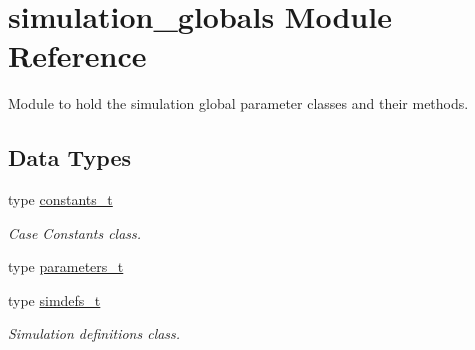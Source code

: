 \hypertarget{namespacesimulation__globals}{}\section{simulation\+\_\+globals Module Reference}
\label{namespacesimulation__globals}


Module to hold the simulation global parameter classes and their methods.  


\subsection*{Data Types}
\begin{DoxyCompactItemize}
\item 
type \mbox{\hyperlink{structsimulation__globals_1_1constants__t}{constants\+\_\+t}}
\begin{DoxyCompactList}\small\item\em Case Constants class. \end{DoxyCompactList}\item 
type \mbox{\hyperlink{structsimulation__globals_1_1parameters__t}{parameters\+\_\+t}}
\item 
type \mbox{\hyperlink{structsimulation__globals_1_1simdefs__t}{simdefs\+\_\+t}}
\begin{DoxyCompactList}\small\item\em Simulation definitions class. \end{DoxyCompactList}\end{DoxyCompactItemize}
